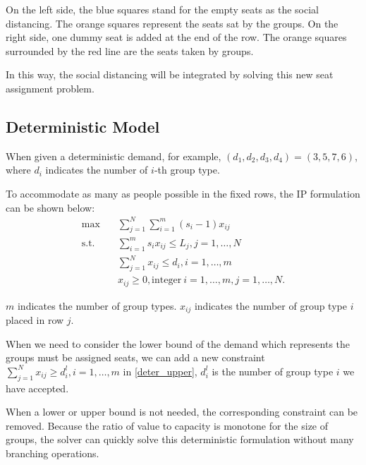 On the left side, the blue squares stand for the empty seats as the social distancing. The orange squares represent the seats sat by the groups. 
On the right side, one dummy seat is added at the end of the row. The orange squares surrounded by the red line are the seats taken by groups.

In this way, the social distancing will be integrated by solving this new seat assignment problem.


\subsection{Deterministic Model}
When given a deterministic demand, for example, $(d_1, d_2, d_3, d_4) = (3,5,7,6)$, where $d_i$ indicates the number of $i$-th group type. 

To accommodate as many as people possible in the fixed rows, the IP formulation can be shown below:
\begin{equation}\label{deter_upper}
    \begin{aligned}
      \max \quad & \sum_{j =1}^{N} \sum_{i = 1}^{m} (s_i -1) x_{ij} \\
      \text {s.t.} \quad & \sum_{i = 1}^{m} s_i x_{ij} \leq L_{j}, j=1,\ldots,N \\
      & \sum_{j =1}^{N} x_{ij} \leq d_{i}, i=1,\ldots,m \\
      & x_{ij} \geq 0, \text{integer}~ i=1,\ldots,m, j=1,\ldots,N.
    \end{aligned}
\end{equation}

$m$ indicates the number of group types. $x_{ij}$ indicates the number of group type $i$ placed in row $j$.

When we need to consider the lower bound of the demand which represents the groups must be assigned seats, we can add a new constraint $\sum_{j =1}^{N} x_{ij} \geq d_{i}^{l}, i=1,\ldots,m$ in \eqref{deter_upper}, $d_{i}^{l}$ is the number of group type $i$ we have accepted.

When a lower or upper bound is not needed, the corresponding constraint can be removed. Because the ratio of value to capacity is monotone for the size of groups, the solver can quickly solve this deterministic formulation without many branching operations.




